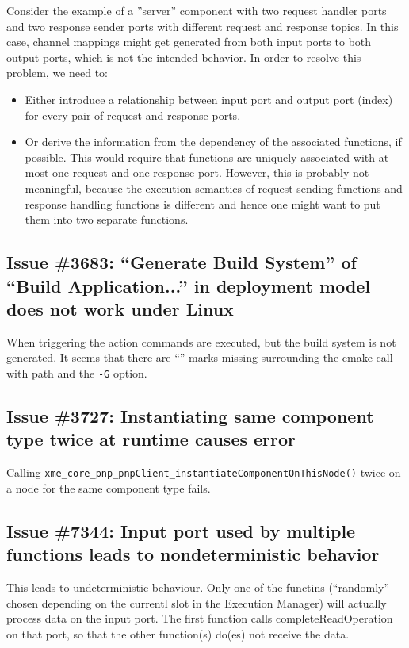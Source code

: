 Consider the example of a ''server'' component with two request handler ports and two response sender ports with different request and response topics.
In this case, channel mappings might get generated from both input ports to both output ports, which is not the intended behavior.
In order to resolve this problem, we need to:
\begin{itemize}
	\item Either introduce a relationship between input port and output port (index) for every pair of request and response ports.
	\item Or derive the information from the dependency of the associated functions, if possible.
		This would require that functions are uniquely associated with at most one request and one response port.
		However, this is probably not meaningful, because the execution semantics of request sending functions
		and response handling functions is different and hence one might want to put them into two separate functions.
\end{itemize}

\subsection{Issue \#3683: ``Generate Build System'' of ``Build Application...'' in deployment model does not work under Linux}

When triggering the action commands are executed, but the build system is not generated. It seems that there are ``''-marks missing surrounding the cmake call with path and the \texttt{-G} option.

\subsection{Issue \#3727: Instantiating same component type twice at runtime causes error}

Calling \texttt{xme\_core\_pnp\_pnpClient\_instantiateComponentOnThisNode()} twice on a node for the same component type fails.

\subsection{Issue \#7344: Input port used by multiple functions leads to nondeterministic behavior}

This leads to undeterministic behaviour. Only one of the functins (``randomly'' chosen depending on the currentl slot in the Execution Manager) will actually process data on the input port.
The first function calls completeReadOperation on that port, so that the other function(s) do(es) not receive the data.

